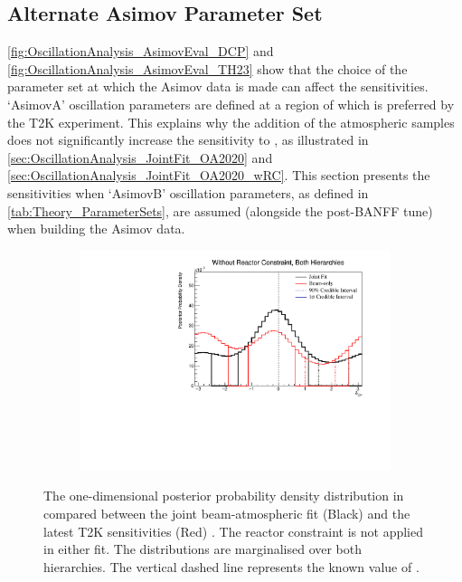 \clearpage
\subsection{Alternate Asimov Parameter Set}
\label{sec:OscillationAnalysis_AsimovB}

\autoref{fig:OscillationAnalysis_AsimovEval_DCP} and \autoref{fig:OscillationAnalysis_AsimovEval_TH23} show that the choice of the parameter set at which the Asimov data is made can affect the sensitivities. `AsimovA' oscillation parameters are defined at a region of  which is preferred by the T2K experiment. This explains why the addition of the atmospheric samples does not significantly increase the sensitivity to , as illustrated in \autoref{sec:OscillationAnalysis_JointFit_OA2020} and \autoref{sec:OscillationAnalysis_JointFit_OA2020_wRC}. This section presents the sensitivities when `AsimovB' oscillation parameters, as defined in \autoref{tab:Theory_ParameterSets}, are assumed (alongside the post-BANFF tune) when building the Asimov data.

\begin{figure}[h]
  \begin{subfigure}[t]{0.98\textwidth}
    \includegraphics[width=\textwidth, trim={0mm 0mm 0mm 0mm}, clip,page=1]{Figures/OA/JointFit_OA2020_Comp_AsimovB/ContourComparison_1D_dcp_BH_2_woRC_UnSmeared_CredibleInterval.pdf}
  \end{subfigure}
  \caption{The one-dimensional posterior probability density distribution in  compared between the joint beam-atmospheric fit (Black) and the latest T2K sensitivities (Red) \cite{Dunne2020-uf, t2k_tn_393}. The reactor constraint is not applied in either fit. The distributions are marginalised over both hierarchies. The vertical dashed line represents the known value of .}
  \label{fig:OscillationAnalysis_JointFit_AsimovB_DCP}
\end{figure}

